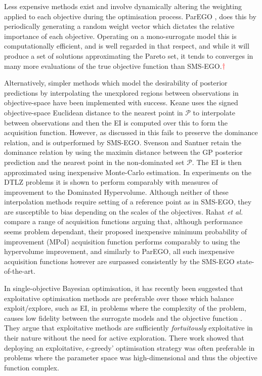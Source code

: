 \documentclass[conference]{IEEEtran}
\makeatletter
\newcommand\hpv{Dominated Hypervolume\xspace}
\newcommand\smsego{SMS-EGO\xspace}
\newcommand\ei{EI\xspace}
\newcommand\gp{GP\xspace}
\newcommand{\mnote}[2][\textcolor{red}{\dagger}]{$#1$\marginpar{\color{red}\raggedright\tiny$#1$
    #2}}
\newcommand*{\etal}{\textit{et al.}\@\xspace}
\makeatother
\begin{document}
Less expensive methods exist and involve dynamically altering the weighting applied to each objective during the optimisation process. ParEGO \cite{knowles2006parego}, does this by periodically generating a random weight vector which dictates the relative importance of each objective. Operating on a mono-surrogate model this is computationally efficient, and is well regarded in that respect, and while it will produce a set of solutions approximating the Pareto set, it tends to converges in many more evaluations of the true objective function than \smsego.\mnote{think you nee a citation for this claim}

Alternatively, simpler methods which model the desirability of posterior predictions by interpolating the unexplored regions between observations in objective-space have been implemented with success. Keane \cite{keane2006statistical} uses the signed objective-space Euclidean distance to the nearest point in $\mathcal{P}$ to interpolate between observations and then the \ei is computed over this to form the acquisition function. However, as discussed in \cite{wagner2010expected} this fails to preserve the dominance relation, and is outperformed by \smsego. Svenson and Santner  \cite{svenson2016multiobjective} retain the dominance relation by using the maximin distance between the \gp posterior prediction and the nearest point in the non-dominated set $\mathcal{P}$. The \ei is then approximated using inexpensive Monte-Carlo estimation. In experiments on the DTLZ problems \cite{deb2005scalable} it is shown to perform comparably with measures of improvement to the \hpv. Although neither of these interpolation methods require setting of a reference point as in \smsego, they are susceptible to bias depending on the scales of the objectives. Rahat \etal \cite{rahat2017alternative} compare a range of acquisition functions arguing that, although performance seems problem dependant, their proposed inexpensive minimum probability of improvement (MPoI) acquisition function performs comparably to using the hypervolume improvement, and similarly to ParEGO, all such inexpensive acquisition functions however are surpassed consistently by the \smsego state-of-the-art.

In single-objective Bayesian optimisation, it has recently been suggested that exploitative optimisation methods are preferable over those which balance exploit/explore, such as \ei, in problems where the complexity of the problem, causes low fidelity between the surrogate models and the objective function \cite{death2019greed}. They argue that exploitative methods are sufficiently \textit{fortuitously} exploitative in their nature without the need for active exploration. There work showed that deploying an exploitative, $\epsilon$-greedy' optimisation strategy was often preferable in problems where the parameter space was high-dimensional and thus the objective function complex.
\end{document}
